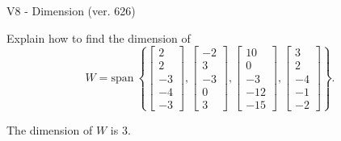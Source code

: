 \begin{exercise}
  \begin{exerciseTitle}V8 - Dimension (ver. 626)\end{exerciseTitle}
  \begin{exerciseStatement}
    Explain how to find the dimension of 
\[W=\mathrm{span}\ \left\{\left[\begin{array}{r}
2 \\
2 \\
-3 \\
-4 \\
-3
\end{array}\right] , \left[\begin{array}{r}
-2 \\
3 \\
-3 \\
0 \\
3
\end{array}\right] , \left[\begin{array}{r}
10 \\
0 \\
-3 \\
-12 \\
-15
\end{array}\right] , \left[\begin{array}{r}
3 \\
2 \\
-4 \\
-1 \\
-2
\end{array}\right]\right\}.\]



  \end{exerciseStatement}
  \begin{exerciseAnswer}
   The dimension of \(W\) is  \(3\).
  


  \end{exerciseAnswer}
\end{exercise}